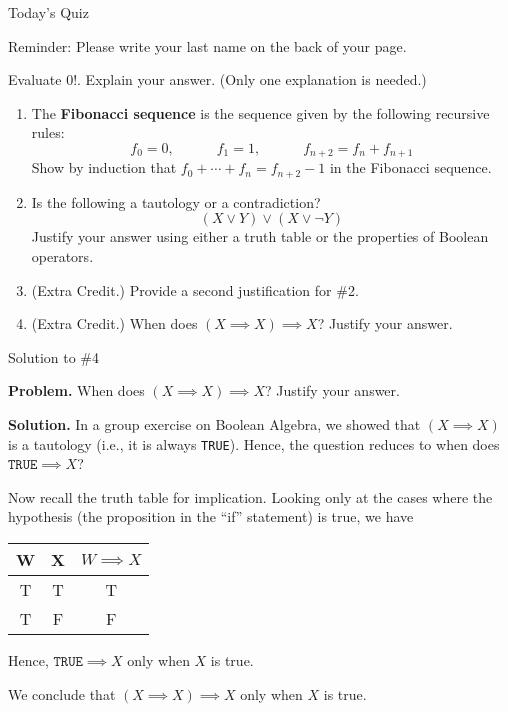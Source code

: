 \documentclass[10pt]{beamer}
\begin{document}
\begin{frame}{Today's Quiz}
\footnotesize 

\alert{Reminder:} Please write your last name on the back of your page.
\vfill 

 \begin{myredbox}[title=Reading Quiz (Factorial)]
Evaluate $0!$. Explain your answer.  (Only one explanation is needed.)
\end{myredbox}

\vfill \vfill 
 \begin{mygreenbox}[title=Problems Quiz (Boolean Algebra \& Induction)]
\begin{enumerate}
	\item The \textbf{Fibonacci sequence} is the sequence given by the following recursive rules:
	\[f_0 =0, \qquad \quad f_1 =1, \qquad \quad f_{n+2} = f_n + f_{n+1} \] Show by induction that $f_0 + \cdots + f_n = f_{n+2} -1$ in the Fibonacci sequence.
	\item Is the following a tautology or a contradiction?
		\[ (X \lor Y) \lor (X \lor \lnot Y) \]
 	    Justify your answer using either a truth table or the properties of Boolean operators. 
 	\item (Extra Credit.) Provide a second justification for \#2.
 	\item (Extra Credit.) When does $(X \implies X) \implies X$? Justify your answer.
\end{enumerate}
\end{mygreenbox}
\end{frame}


\begin{frame}{Solution to \#4}

\textbf{Problem.} When does $(X \implies X) \implies X$? Justify your answer.

\vfill 
\textbf{Solution.} In a group exercise on Boolean Algebra, we showed that $(X \implies X)$ is a tautology (i.e., it is always \texttt{TRUE}).  Hence, the question reduces to when does $\texttt{TRUE} \implies X$? 

Now recall the truth table for implication. Looking only at the cases where the hypothesis (the proposition in the \enquote{if} statement) is true, we have

\begin{table}
\centering
\begin{tabular}{cc|c}
W  & X & $W \implies X$  \\
\hline 
T & T & T  \\
T & F & F \\
\end{tabular}
\end{table}

Hence, $\texttt{TRUE} \implies X$ only when $X$ is true.

We conclude that $(X \implies X) \implies X$ only when $X$ is true. 
\end{frame}
\end{document}
